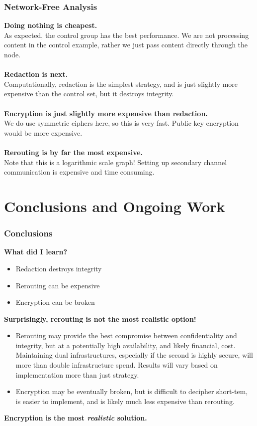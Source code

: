 \documentclass[t,handout]{beamer}
\begin{document}
\begin{frame}
\frametitle{Network-Free Analysis}
{\bf Doing nothing is cheapest.} \\
{\scriptsize As expected, the control group has the best performance.  We are not processing content in the control example, rather we just pass content directly through the node.} \\
~\\
{\bf Redaction is next.} \\
{\scriptsize Computationally, redaction is the simplest strategy, and is just slightly more expensive than the control set, but it destroys integrity.} \\
~\\
{\bf Encryption is just slightly more expensive than redaction.} \\
{\scriptsize We do use symmetric ciphers here, so this is very fast.  Public key encryption would be more expensive.}\\
~\\
{\bf Rerouting is by far the most expensive.} \\
{\scriptsize Note that this is a logarithmic scale graph! Setting up secondary channel communication is expensive and time consuming.} \\
\end{frame}

\section{Conclusions and Ongoing Work}

\begin{frame}
\frametitle{Conclusions}
{\bf What did I learn?}
\begin{small}
\begin{itemize}
\item Redaction destroys integrity
\item Rerouting can be expensive
\item Encryption can be broken
\end{itemize}
\end{small}
{\bf Surprisingly, rerouting is not the most realistic option!}
\begin{small}
\begin{itemize}
\item Rerouting may provide the best compromise between confidentiality and integrity, but at a potentially high availability, and likely financial, cost.  Maintaining dual infrastructures, especially if the second is highly secure, will more than double infrastructure spend.  Results will vary based on implementation more than just strategy.
\item Encryption may be eventually broken, but is difficult to decipher short-tem, is easier to implement, and is likely much less expensive than rerouting.
\end{itemize}
\end{small}
{\bf Encryption is the most \textit{realistic} solution.}
\end{frame}
\end{document}
